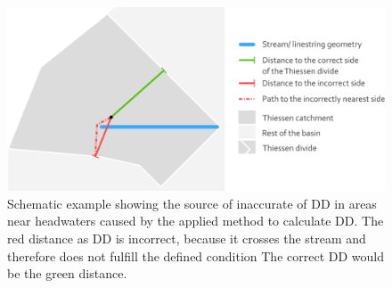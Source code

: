 \documentclass[fleqn,10pt]{wlscirep}
\begin{document}
\normalsize

\footnotesize

\begin{figure}[H]

{\centering \includegraphics[width=0.7\linewidth]{data_descriptor/tex/dd_inaccuracies} 

}

\caption{Schematic example showing the source of inaccurate of DD in areas near headwaters caused by the applied method to calculate DD. The red distance as DD is incorrect, because it crosses the stream and therefore does not fulfill the defined condition  The correct DD would be the green distance.}\label{fig:ddinaccuracies}
\end{figure}

\normalsize

\footnotesize
\end{document}

